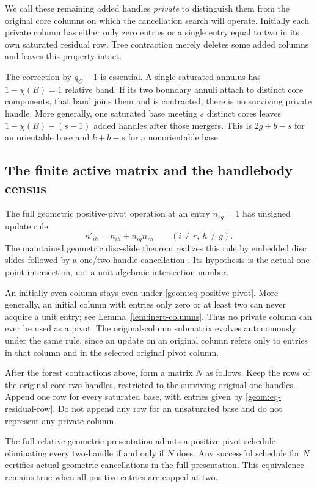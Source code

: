We call these remaining added handles \emph{private} to distinguish
them from the original core columns on which the cancellation search
will operate.  Initially each private column has either only zero
entries or a single entry equal to two in its own saturated residual
row.  Tree contraction merely deletes some added columns and leaves
this property intact.

The correction by $q_C-1$ is essential.  A single saturated annulus
has $1-\chi(B)=1$ relative band.  If its two boundary annuli attach
to distinct core components, that band joins them and is contracted;
there is no surviving private handle.  More generally, one saturated
base meeting $s$ distinct cores leaves $1-\chi(B)-(s-1)$ added
handles after those mergers.  This is $2g+b-s$ for an orientable
base and $k+b-s$ for a nonorientable base.

\subsection{The finite active matrix and the handlebody census}
\label{geom:active-matrix}

The full geometric positive-pivot operation at an entry $n_{rg}=1$
has unsigned update rule
\begin{equation}
 n'_{ih}=n_{ih}+n_{ig}n_{rh}
 \qquad(i\ne r,\ h\ne g).
 \label{geom:eq-positive-pivot}
\end{equation}
The maintained geometric disc-slide theorem realizes this rule by
embedded disc slides followed by a one/two-handle cancellation
\cite{marked-parallelity-85}.  Its hypothesis is the actual one-point
intersection, not a unit algebraic intersection number.

An initially even column stays even under
\eqref{geom:eq-positive-pivot}.  More generally, an initial column
with entries only zero or at least two can never acquire a unit
entry; see Lemma~\ref{lem:inert-columns}.  Thus no private column
can ever be used as a pivot.  The original-column submatrix evolves
autonomously under the same rule, since an update on an original
column refers only to entries in that column and in the selected
original pivot column.

\begin{proposition}
\label{geom:prop-active-compilation}
After the forest contractions above, form a matrix $N$ as follows.
Keep the rows of the original core two-handles, restricted to the
surviving original one-handles.  Append one row for every saturated
base, with entries given by \eqref{geom:eq-residual-row}.  Do not
append any row for an unsaturated base and do not represent any
private column.

The full relative geometric presentation admits a positive-pivot
schedule eliminating every two-handle if and only if $N$ does.
Any successful schedule for $N$ certifies actual geometric
cancellations in the full presentation.  This equivalence remains
true when all positive entries are capped at two.
\end{proposition}

